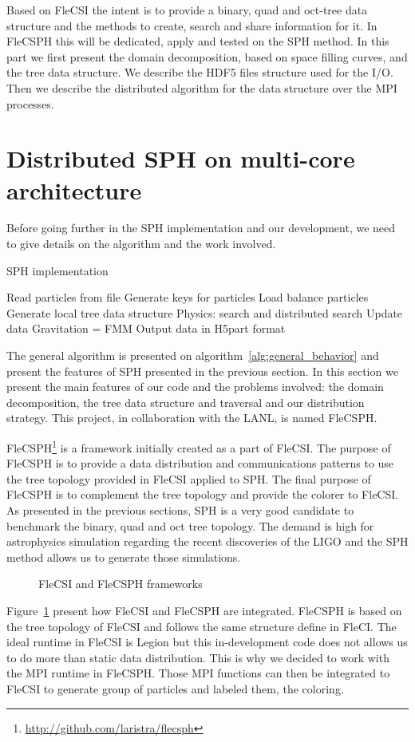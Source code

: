 Based on FleCSI the intent is to provide a binary, quad and oct-tree data structure and the methods to create, search and share information for it. 
In FleCSPH this will be dedicated, apply and tested on the SPH method. 
In this part we first present the domain decomposition, based on space filling curves, and the tree data structure.
We describe the HDF5 files structure used for the I/O.
Then we describe the distributed algorithm for the data structure over the MPI processes. 

\section{Distributed SPH on multi-core architecture}
Before going further in the SPH implementation and our development, we need to give details on the algorithm and the work involved. 
%
\begin{algorithm}
\caption{SPH implementation}\label{alg:general_behavior}
\begin{algorithmic}[1]
\State Read particles from file 
\State Generate keys for particles 
\State Load balance particles 
\State Generate local tree data structure
\State Physics: search and distributed search
\State Update data 
\EndWhile
\State Gravitation = FMM
\State Output data in H5part format
\EndIf
\EndWhile
\end{algorithmic}
\end{algorithm}
%
The general algorithm is presented on algorithm~\ref{alg:general_behavior} and present the features of SPH presented in the previous section. 
In this section we present the main features of our code and the problems involved: the domain decomposition, the tree data structure and traversal and our distribution strategy. 
This project, in collaboration with the LANL, is named FleCSPH. 

FleCSPH\footnote{\url{http://github.com/laristra/flecsph}} is a framework initially created as a part of FleCSI. 
The purpose of FleCSPH is to provide a data distribution and communications patterns to use the tree topology provided in FleCSI applied to SPH.
The final purpose of FleCSPH is to complement the tree topology and provide the colorer to FleCSI. 
As presented in the previous sections, SPH is a very good candidate to benchmark the binary, quad and oct tree topology. 
The demand is high for astrophysics simulation regarding the recent discoveries of the LIGO and the SPH method allows us to generate those simulations. 
\begin{figure}[t!]
\centering

\caption{FleCSI and FleCSPH frameworks }
\label{fig:flecsi_flecsph_framework}
\end{figure}
Figure~\ref{fig:flecsi_flecsph_framework} present how FleCSI and FleCSPH are integrated. 
FleCSPH is based on the tree topology of FleCSI and follows the same structure define in FleCI. 
The ideal runtime in FleCSI is Legion but this in-development code does not allows us to do more than static data distribution. 
This is why we decided to work with the MPI runtime in FleCSPH. 
Those MPI functions can then be integrated to FleCSI to generate group of particles and labeled them, the coloring. 

